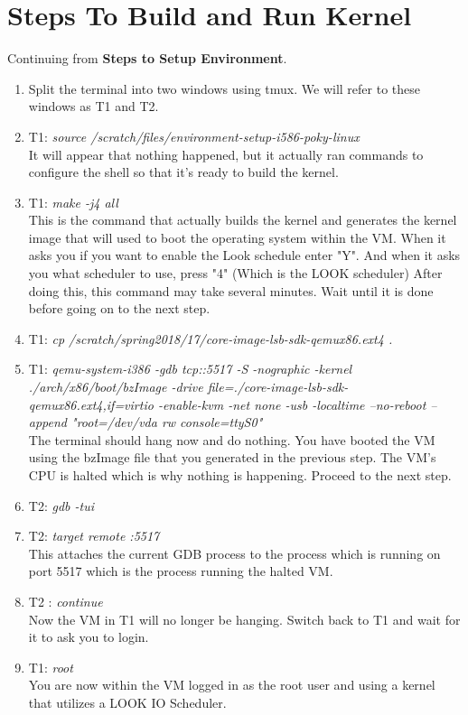 \documentclass[onecolumn,draftclsnofoot, 10pt, compsoc]{IEEEtran}
\begin{document}
\section{Steps To Build and Run Kernel}
	Continuing from \textbf{Steps to Setup Environment}.
	\begin{enumerate}
		\item
			Split the terminal into two windows using tmux.
			We will refer to these windows as T1 and T2. 
		\item
			T1: \textit{source /scratch/files/environment-setup-i586-poky-linux} \\
			It will appear that nothing happened, but it actually ran commands to configure the shell so that it’s ready to build the kernel. 
		\item
			T1: \textit{make -j4 all} \\
			This is the command that actually builds the kernel and generates the kernel image that will used to boot the operating system within the VM. 
			When it asks you if you want to enable the Look schedule enter "Y". And when it asks you what scheduler to use, press "4" (Which is the LOOK scheduler)
			After doing this, this command may take several minutes. 
			Wait until it is done before going on to the next step.
		\item
			T1: \textit{cp /scratch/spring2018/17/core-image-lsb-sdk-qemux86.ext4 .}
		\item
			T1: 
			\textit{qemu-system-i386 -gdb tcp::5517 -S -nographic -kernel ./arch/x86/boot/bzImage -drive file=./core-image-lsb-sdk-qemux86.ext4,if=virtio -enable-kvm -net none -usb -localtime --no-reboot --append "root=/dev/vda rw console=ttyS0"} \\
			The terminal should hang now and do nothing. 
			You have booted the VM using the bzImage file that you generated in the previous step. 
			The VM’s CPU is halted which is why nothing is happening. 
			Proceed to the next step.	
		\item
			T2: \textit{gdb -tui}
		\item
			T2: \textit{target remote :5517} \\
			This attaches the current GDB process to the process which is running on port 5517 which is the process running the halted VM.
		\item
			T2 : \textit{continue} \\
			Now the VM in T1 will no longer be hanging. 
			Switch back to T1 and wait for it to ask you to login.
		\item
			T1: \textit{root} \\
			You are now within the VM logged in as the root user and using a kernel that utilizes a LOOK IO Scheduler. 
	\end{enumerate}
\end{document}
